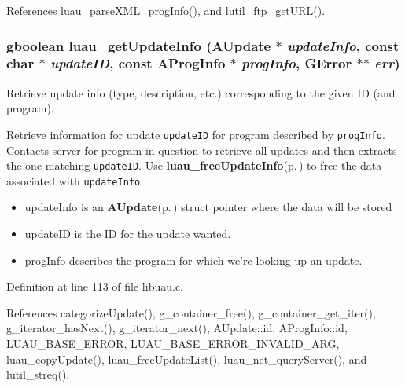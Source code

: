 References luau\_\-parse\-XML\_\-prog\-Info(), and lutil\_\-ftp\_\-get\-URL().
\subsubsection{\setlength{\rightskip}{0pt plus 5cm}gboolean luau\_\-get\-Update\-Info ({\bf AUpdate} $\ast$ {\em update\-Info}, const char $\ast$ {\em update\-ID}, const {\bf AProg\-Info} $\ast$ {\em prog\-Info}, GError $\ast$$\ast$ {\em err})}\label{libuau_8c_a7}


Retrieve update info (type, description, etc.) corresponding to the given ID (and program). 

Retrieve information for update {\tt update\-ID} for program described by {\tt prog\-Info}. Contacts server for program in question to retrieve all updates and then extracts the one matching {\tt update\-ID}. Use {\bf luau\_\-free\-Update\-Info}{\rm (p.\,\pageref{libuau_8h_a97})} to free the data associated with {\tt update\-Info} 

\begin{itemize}
\item update\-Info is an {\bf AUpdate}{\rm (p.\,\pageref{structAUpdate})} struct pointer where the data will be stored \item update\-ID is the ID for the update wanted. \item prog\-Info describes the program for which we're looking up an update. 
\end{itemize}


Definition at line 113 of file libuau.c.

References categorize\-Update(), g\_\-container\_\-free(), g\_\-container\_\-get\_\-iter(), g\_\-iterator\_\-has\-Next(), g\_\-iterator\_\-next(), AUpdate::id, AProg\-Info::id, LUAU\_\-BASE\_\-ERROR, LUAU\_\-BASE\_\-ERROR\_\-INVALID\_\-ARG, luau\_\-copy\-Update(), luau\_\-free\-Update\-List(), luau\_\-net\_\-query\-Server(), and lutil\_\-streq().
